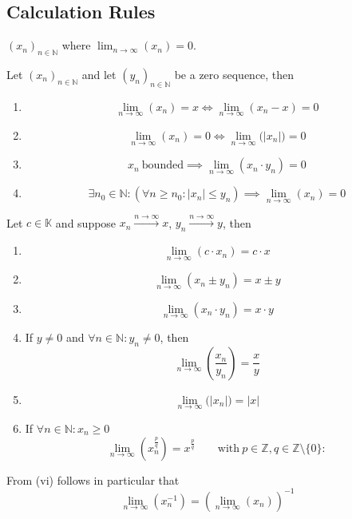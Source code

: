 \subsection{Calculation Rules}
\begin{definition}
   \((x_n)_{n \in \mathbb{N}}\) where \(\lim_{n \to \infty}(x_n) = 0\).
\end{definition}

\begin{proposition}\label{lem:zero_seq}
   Let \((x_n)_{n \in \mathbb{N}}\) and let \((y_n)_{n \in \mathbb{N}}\) be a zero sequence, then
   \begin{enumerate}[label=\roman*, align=Center]
      \item \[\lim_{n \to \infty}(x_n) = x \iff \lim_{n \to \infty} (x_n - x) = 0\]
      \item \[\lim_{n \to \infty}(x_n) = 0 \iff \lim_{n \to \infty}\big(\lvert x_n\rvert\big) = 0\]
      \item \[x_n~\text{bounded} \implies \lim_{n \to \infty} (x_n \cdot y_n) = 0\]
      \item \[\exists n_0 \in \mathbb{N}: (\forall n \geq n_0: |x_n| \leq y_n) \implies \lim_{n \to \infty}(x_n) = 0\]
   \end{enumerate}
\end{proposition}

\begin{proposition}\label{pro:seq_limit_rules}
   Let \(c \in \mathbb{K}\) and suppose \(x_n \xrightarrow{n \to \infty} x\), \(y_n \xrightarrow{n \to \infty} y\), then
   \begin{enumerate}[label=\roman*, align=Center]
      \item \[\lim_{n \to \infty}(c \cdot x_n) = c \cdot x\]
      \item \[\lim_{n \to \infty}(x_n \pm y_n) = x \pm y\]
      \item \[\lim_{n \to \infty}(x_n \cdot y_n) = x \cdot y\]
      \item If \(y \neq 0\) and \(\forall n \in \mathbb{N}: y_n \neq 0\), then
         \[\lim_{n \to \infty} \left(\frac{x_n}{y_n}\right) = \frac{x}{y}\]
      \item \[\lim_{n \to \infty}\big(\lvert x_n\rvert\big) = \lvert x \rvert\]
      \item If \(\forall n \in \mathbb{N}: x_n \geq 0\)
         \[\lim_{n \to \infty} \left(x_n^{\frac{p}{q}}\right) = x^{\frac{p}{q}} \qquad\text{with}~p \in \mathbb{Z}, q \in \mathbb{Z} \setminus \{0\}: \]
   \end{enumerate}
\end{proposition}
\begin{remark}
   From (vi) follows in particular that
   \[\lim_{n \to \infty}(x_n^{-1}) = \left(\lim_{n \to \infty}(x_n)\right)^{-1}\]
\end{remark}

